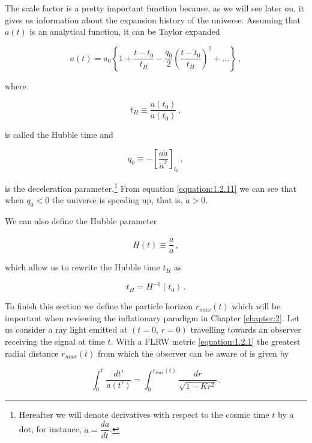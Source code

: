 The scale factor is a pretty important function because, as we will see later on, it gives us information about the expansion history of the universe. Assuming that $ a(t) $ is an analytical function, it can be Taylor expanded 

\begin{equation}
a(t)=a_0\left \{1+\frac{t-t_0}{t_H}-\frac{q_0}{2}\left(\frac{t-t_0}{t_H}\right)^2+\dots\right \} \, ,
\label{equation:1.2.9}
\end{equation}

where

\begin{equation}
t_H \equiv \frac{a(t_0)}{\dot{a}(t_0)} \, ,
\label{equation:1.2.10}
\end{equation}

is called the Hubble time and

\begin{equation}
q_0 \equiv -\left[\frac{a\ddot{a}}{\dot{a}^2}\right]_{t_0} \, ,
\label{equation:1.2.11}
\end{equation}

is the deceleration parameter.\footnote{Hereafter we will denote derivatives with respect to the cosmic time $ t $ by a dot, for instance, $ \dot{a} = \dfrac{d a}{d t}$.} From equation \eqref{equation:1.2.11} we can see that when $ q_0<0 $ the universe is speeding up, that is, $ \ddot{a}>0 $.

We can also define the Hubble parameter 

\begin{equation}
H(t)\equiv \frac{\dot{a}}{a} \, ,
\label{equation:1.2.12}
\end{equation}

which allow us to rewrite the Hubble time $ t_H $ as

\begin{equation}
t_H = H^{-1}(t_0) \, .
\label{equation:1.2.13}
\end{equation}
 
To finish this section we define the particle horizon $ r_{max}(t) $ which will be important when reviewing the inflationary paradigm in Chapter \ref{chapter:2}. Let us consider a ray light emitted at  $ (t=0,\,r=0) $ travelling towards an observer receiving the signal at time $ t $. With a FLRW metric \eqref{equation:1.2.1} the greatest  radial distance $ r_{max}(t) $ from which the observer can be aware of is given by 
 
\begin{equation}
\int_0^t \frac{dt'}{a(t')} = \int_0^{r_{max}(t)} \frac{dr}{\sqrt{1-K r^2}} \, .
\label{equation:1.2.14}
\end{equation} 

